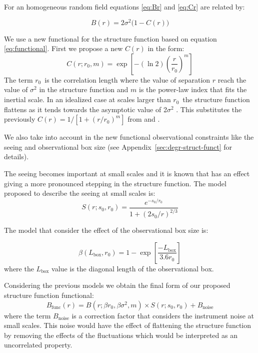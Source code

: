 \documentclass[fleqn,usenatbib, useAMS, a4paper]{mnras}
\begin{document}
For an homogeneous random field equations \ref{eq:Br} and \ref{eq:Cr} are related by:

\begin{equation}\label{eq:functional}
B(r) = 2\sigma^2 \bigl( 1 - C(r) \bigr)
\end{equation}

We use a new functional for the structure function based on equation \ref{eq:functional}. 
First we propose a new \(C(r)\) in the form:
%
\begin{equation}\label{eq:ffnew}
  C(r; r_0, m) = \exp \left[ -(\ln 2) \left( \frac{r}{r_0} \right)^m \right]
\end{equation}
%
The term \(r_{0}\)\ is the correlation length where the value of separation \(r\) reach the value of \(\sigma^2\) in the structure function and $m$ is the power-law index that fits the inertial scale.
In an idealized case at scales larger than \(r_{0}\)\ the structure function flattens as it tends towards the asymptotic value of 2\(\sigma^2\) \citep{arthur2016turbulence}.
This substitutes the previously \(C(r) = 1/[1+(r/r_{0})^{m}]\) from \citet{1966igd..book.....K} and
\citet{1984ApJ...277..556S}.

We also take into account in the new functional observational constraints like the seeing and observational box size (see Appendix~\ref{sec:degr-struct-funct} for details). 

The seeing becomes important at small scales and it is known that has an effect giving a more pronounced stepping in the structure function.
The model proposed to describe the seeing at small scales is:
%
\begin{equation}\label{eq:ffs}
  S(r; s_0, r_0) = \frac{
    e^{-s_0 / r_0}
  }{
    1+(2s_0 / r)^{2 / 3}
  }
\end{equation}

The model that consider the effect of the observational box size is:

\begin{equation}\label{eq:ffb}
  \beta(L_{\text{box}},r_0) = 1 - \exp \left[ \frac{-L_{\text{box}}} {3.6 r_0} \right] 
\end{equation}
%
where the \(L_{\text{box}}\) value is the diagonal length of the observational box.

Considering the previous models we obtain the final form of our proposed structure function functional:
%
\begin{equation}\label{eq:sf-functional}
B_{\text{func}}(r) = B(r; \beta r_0, \beta \sigma^2,m) \times S(r; s_0, r_0) + B_{\text{noise}}
\end{equation}
%
where the term \( B_{\text{noise}}\) is a correction factor that considers the instrument noise at small scales.
This noise would have the effect of flattening the structure function by removing the effects of the fluctuations which would be interpreted as an uncorrelated property. 
\end{document}
